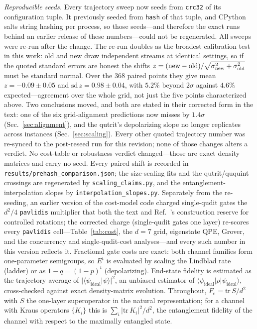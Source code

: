 \documentclass[aps,pra,reprint,superscriptaddress,nofootinbib,floatfix]{revtex4-2}
\newcommand{\Fe}{F_{\mathrm{e}}}
\begin{document}
\emph{Reproducible seeds.} Every trajectory sweep now seeds from
\texttt{crc32} of its configuration tuple. It previously seeded from
\texttt{hash} of that tuple, and CPython salts string hashing per
process, so those seeds---and therefore the exact runs behind an
earlier release of these numbers---could not be regenerated. All
sweeps were re-run after the change. The re-run doubles as the
broadest calibration test in this work: old and new draw independent
streams at identical settings, so if the quoted standard errors are
honest the shifts $z=(\text{new}-\text{old})/\sqrt{\sigma_{\rm
new}^2+\sigma_{\rm old}^2}$ must be standard normal. Over the $368$
paired points they give mean $z=-0.09\pm0.05$ and
$\mathrm{sd}\,z=0.98\pm0.04$, with $5.2\%$ beyond $2\sigma$ against
$4.6\%$ expected---agreement over the whole grid, not just the five
points characterized above. Two conclusions moved, and both are stated
in their corrected form in the text: one of the six
grid-alignment predictions now misses by $1.4\sigma$
(Sec.~\ref{sec:alignment}), and the qutrit's depolarizing slope no longer
replicates across instances (Sec.~\ref{sec:scaling}). Every other
quoted trajectory number was re-synced to the post-reseed run for this
revision; none of those changes alters a verdict. No cost-table
or robustness verdict changed---those are exact density matrices and
carry no seed. Every paired shift is recorded in
\texttt{results/prehash\_comparison.json}; the size-scaling fits and
the qutrit/ququint crossings are regenerated by
\texttt{scaling\_claims.py}, and the entanglement-interpolation
slopes by \texttt{interpolation\_slopes.py}. Separately from the
re-seeding, an earlier version of the cost-model code charged
single-qudit gates the $d^2/4$ \texttt{pavlidis} multiplier that
both the text and Ref.~\cite{pavlidis2021}'s construction reserve
for controlled rotations; the corrected charge (single-qudit gates
one layer) re-scores every \texttt{pavlidis} cell---Table~\ref{tab:cost},
the $d=7$ grid, eigenstate QPE, Grover, and the concurrency and
single-qudit-cost analyses---and every such number in this version
reflects it. Fractional gate costs are exact: both channel families form
one-parameter semigroups, so $E^t$ is evaluated by scaling the Lindblad
rate (ladder) or as $1-q=(1-p)^t$ (depolarizing). End-state fidelity is
estimated as the trajectory average of
$\lvert\langle\psi_{\mathrm{ideal}}\vert\psi\rangle\rvert^2$, an
unbiased estimator of
$\langle\psi_{\mathrm{ideal}}\rvert\rho\lvert\psi_{\mathrm{ideal}}\rangle$,
cross-checked against exact density-matrix evolution. Throughout,
$\Fe=\mathrm{tr}\,S/d^2$ with $S$ the one-layer superoperator in the
natural representation; for a channel with Kraus operators $\{K_i\}$
this is $\sum_i\lvert\mathrm{tr}\,K_i\rvert^2/d^2$, the entanglement
fidelity of the channel with respect to the maximally entangled
state.
\end{document}
